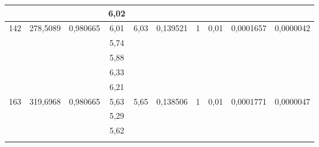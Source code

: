 \documentclass[a4paper, 12pt]{article}
\begin{document}
\begin{table}[h!]
\begin{tabular}{|c|c|c|c|c|c|c|c|c|c|}
                     &                           &                           & 6,02           &                           &                                    &                    &                         &                            &                               \\ \hline
\multirow{5}{*}{142} & \multirow{5}{*}{278,5089} & \multirow{5}{*}{0,980665} & 6,01           & \multirow{5}{*}{6,03}     & \multirow{5}{*}{0,139521}          & \multirow{5}{*}{1} & \multirow{5}{*}{0,01}   & \multirow{5}{*}{0,0001657} & \multirow{5}{*}{0,0000042}    \\ \cline{4-4}
                     &                           &                           & 5,74           &                           &                                    &                    &                         &                            &                               \\ \cline{4-4}
                     &                           &                           & 5,88           &                           &                                    &                    &                         &                            &                               \\ \cline{4-4}
                     &                           &                           & 6,33           &                           &                                    &                    &                         &                            &                               \\ \cline{4-4}
                     &                           &                           & 6,21           &                           &                                    &                    &                         &                            &                               \\ \hline
\multirow{5}{*}{163} & \multirow{5}{*}{319,6968} & \multirow{5}{*}{0,980665} & 5,63           & \multirow{5}{*}{5,65}     & \multirow{5}{*}{0,138506}          & \multirow{5}{*}{1} & \multirow{5}{*}{0,01}   & \multirow{5}{*}{0,0001771} & \multirow{5}{*}{0,0000047}    \\ \cline{4-4}
                     &                           &                           & 5,29           &                           &                                    &                    &                         &                            &                               \\ \cline{4-4}
                     &                           &                           & 5,62           &                           &                                    &                    &                         &                            &                               \\ \cline{4-4}

\end{tabular}
\end{table}
\end{document}
